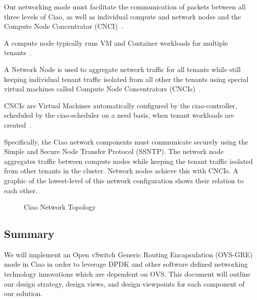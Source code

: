 \documentclass[10pt,onecolumn,journal,draftclsnofoot]{IEEEtran}
\begin{document}
Our networking mode must facilitate the communication of packets between all
three levels of Ciao, as well as individual compute and network
nodes and the Compute Node Concentrator (CNCI)~\cite{ciaoNetworking}.

\begin{description}[leftmargin=12em,style=nextline]
	\item[Compute Node]
		A compute node typically runs VM and Container workloads for
		multiple tenants~\cite{ciaoNetworking}.
	\item[Network Node]
		A Network Node is used to aggregate network traffic for all
		tenants while still keeping individual tenant traffic isolated
		from all other the tenants using special virtual machines called
		Compute Node Concentrators (CNCIs)~\cite{ciaoNetworking}.
	\item[Compute Node Concentrator (CNCI)]
		CNCIs are Virtual Machines automatically configured by the
		ciao-controller, scheduled by the ciao-scheduler on a need
		basis, when tenant workloads are created~\cite{ciaoNetworking}.
\end{description}

Specifically, the Ciao network components must communicate securely using the
Simple and Secure Node Transfer Protocol (SSNTP). The network node aggregates
traffic between compute nodes while keeping the tenant traffic isolated from
other tenants in the cluster. Network nodes achieve this with CNCIs. A graphic
of the lowest-level of this network configuration shows their relation to each
other.

\begin{figure}[H]
	\caption{Ciao Network Topology~\cite{ciaoNetTopology}}
	\begin{center}
	\end{center}
\end{figure}

\subsection{Summary}

We will implement an Open vSwitch Generic Routing Encapsulation (OVS-GRE) mode
in Ciao in order to leverage DPDK and other software defined networking
technology innovations which are dependent on OVS. This document will outline
our design strategy, design views, and design viewpoints for each component of
our solution.
\end{document}
